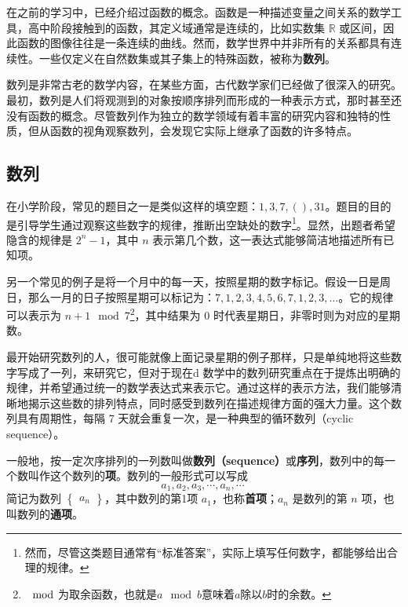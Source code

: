 
\begin{issues}
\issueDraft
\end{issues}

在之前的学习中，已经介绍过函数的概念。函数是一种描述变量之间关系的数学工具，高中阶段接触到的函数，其定义域通常是连续的，比如实数集 $\mathbb{R}$ 或区间，因此函数的图像往往是一条连续的曲线。然而，数学世界中并非所有的关系都具有连续性。一些仅定义在自然数集或其子集上的特殊函数，被称为\textbf{数列}。

数列是非常古老的数学内容，在某些方面，古代数学家们已经做了很深入的研究。最初，数列是人们将观测到的对象按顺序排列而形成的一种表示方式，那时甚至还没有函数的概念。尽管数列作为独立的数学领域有着丰富的研究内容和独特的性质，但从函数的视角观察数列，会发现它实际上继承了函数的许多特点。

\subsection{数列}

在小学阶段，常见的题目之一是类似这样的填空题：$1,3,7,(),31$。题目的目的是引导学生通过观察这些数字的规律，推断出空缺处的数字\footnote{然而，尽管这类题目通常有“标准答案”，实际上填写任何数字，都能够给出合理的规律。}。显然，出题者希望隐含的规律是 $2^n - 1$，其中 $n$ 表示第几个数，这一表达式能够简洁地描述所有已知项。

另一个常见的例子是将一个月中的每一天，按照星期的数字标记。假设一日是周日，那么一月的日子按照星期可以标记为：$7,1, 2, 3, 4, 5, 6, 7, 1, 2, 3, \dots$。它的规律可以表示为 $n+1 \mod 7$\footnote{$\mod$为取余函数，也就是$a\mod b$意味着$a$除以$b$时的余数。}，其中结果为 $0$ 时代表星期日，非零时则为对应的星期数。

最开始研究数列的人，很可能就像上面记录星期的例子那样，只是单纯地将这些数字写成了一列，来研究它，但对于现在d
数学中的数列研究重点在于提炼出明确的规律，并希望通过统一的数学表达式来表示它。通过这样的表示方法，我们能够清晰地揭示这些数的排列特点，同时感受到数列在描述规律方面的强大力量。这个数列具有周期性，每隔 7 天就会重复一次，是一种典型的循环数列（cyclic sequence）。


一般地，按一定次序排列的一列数叫做\textbf{数列（sequence）}或\textbf{序列}，数列中的每一个数叫作这个数列的\textbf{项}。数列的一般形式可以写成
\begin{equation}
a_1,a_2,a_3,\cdots,a_n,\cdots~
\end{equation}
简记为数列 $\begin{Bmatrix} a_n \end{Bmatrix}$，其中数列的第1项 $a_1$，也称\textbf{首项}；$a_n$ 是数列的第 $n$ 项，也叫数列的\textbf{通项}。

